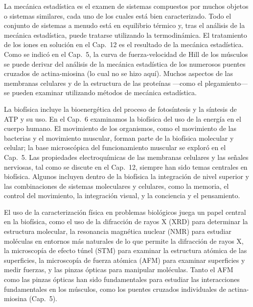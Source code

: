 \documentclass[12pt,a4paper]{book}
\begin{document}
La mecánica estadística es el examen de sistemas compuestos por muchos objetos o sistemas similares, cada uno de los cuales está bien caracterizado. Todo el conjunto de sistemas a menudo está en equilibrio térmico y, tras el análisis de la mecánica estadística, puede tratarse utilizando la termodinámica. El tratamiento de los iones en solución en el Cap.~12 es el resultado de la mecánica estadística. Como se indicó en el Cap.~5, la curva de fuerza-velocidad de Hill de los músculos se puede derivar del análisis de la mecánica estadística de los numerosos puentes cruzados de actina-miosina (lo cual no se hizo aquí). Muchos aspectos de las membranas celulares y de la estructura de las proteínas ---como el plegamiento--- se pueden examinar utilizando métodos de mecánica estadística.

La biofísica incluye la bioenergética del proceso de fotosíntesis y la síntesis de ATP y su uso. En el Cap.~6 examinamos la biofísica del uso de la energía en el cuerpo humano. El movimiento de los organismos, como el movimiento de las bacterias y el movimiento muscular, forman parte de la biofísica molecular y celular; la base microscópica del funcionamiento muscular se exploró en el Cap.~5. Las propiedades electroquímicas de las membranas celulares y las señales nerviosas, tal como se discute en el Cap.~12, siempre han sido temas centrales en biofísica. Algunos incluyen dentro de la biofísica la integración de nivel superior y las combinaciones de sistemas moleculares y celulares, como la memoria, el control del movimiento, la integración visual, y la conciencia y el pensamiento.

El uso de la caracterización física en problemas biológicos juega un papel central en la biofísica, como el uso de la difracción de rayos X (XRD) para determinar la estructura molecular, la resonancia magnética nuclear (NMR) para estudiar moléculas en entornos más naturales de lo que permite la difracción de rayos X, la microscopía de efecto túnel (STM) para examinar la estructura atómica de las superficies, la microscopía de fuerza atómica (AFM) para examinar superficies y medir fuerzas, y las pinzas ópticas para manipular moléculas. Tanto el AFM como las pinzas ópticas han sido fundamentales para estudiar las interacciones fundamentales en los músculos, como los puentes cruzados individuales de actina-miosina (Cap.~5).
\end{document}
